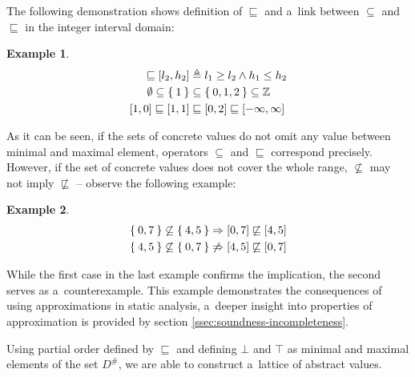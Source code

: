 \documentclass[12pt,oneside]{fithesis2}
\theoremstyle{definition}
\newtheorem{exmp}{Example}[section]
\begin{document}
The following demonstration shows definition of $\sqsubseteq$ and a~link between $\subseteq$ and $\sqsubseteq$ in the integer interval domain:

\begin{exmp}
  \begin{align*}
    [l_1, h_1] \sqsubseteq [l_2, h_2] &\triangleq l_1 \ge l_2 \wedge h_1 \le h_2\\
    \emptyset \subseteq \Set{1} &\subseteq \Set{0, 1, 2} \subseteq \mathbb Z\\
    [1,0] \sqsubseteq [1,1] &\sqsubseteq [0,2] \sqsubseteq [-\infty,\infty]
  \end{align*}
\end{exmp}

As it can be seen, if the sets of concrete values do not omit any value between minimal and maximal element, operators $\subseteq$ and $\sqsubseteq$ correspond precisely. However, if the set of concrete values does not cover the whole range, $\not\subseteq$ may not imply $\not\sqsubseteq$ -- observe the following example:

\begin{exmp}
  \begin{align*}
    \Set{0, 7} \not\subseteq \Set{4, 5} &\Rightarrow [0,7] \not\sqsubseteq [4,5]\\
    \Set{ 4, 5} \not\subseteq \Set{0, 7} &\not\Rightarrow [4,5] \not\sqsubseteq [0,7]\\
  \end{align*}
\end{exmp}

While the first case in the last example confirms the implication, the second serves as a~counterexample. This example demonstrates the consequences of using approximations in static analysis, a~deeper insight into properties of approximation is provided by section \ref{ssec:soundness-incompleteness}.

Using partial order defined by $\sqsubseteq$ and defining $\bot$ and $\top$ as minimal and maximal elements of the set $D^\#$, we are able to construct a~lattice of abstract values.
\end{document}
